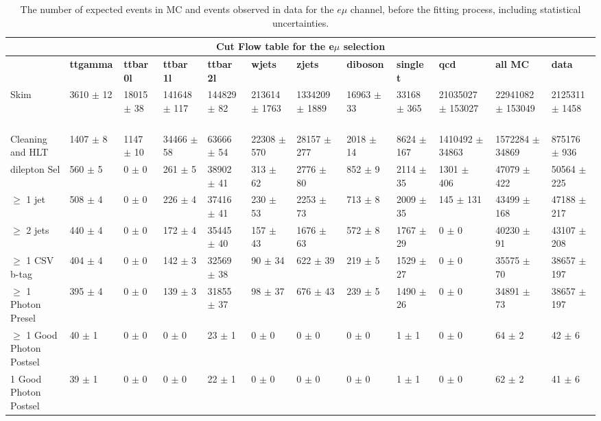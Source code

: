 \begin{table}
  \centering
\resizebox{\columnwidth}{!} {

\begin{tabular}{|l|l|l|l|l|l|l|l|l|l|l|l|}
\hline
\multicolumn{12}{|c|}{\textbf{Cut Flow table for the e$\mu$ selection}} \\
\hline
& \textbf{ttgamma} & \textbf{ttbar 0l} & \textbf{ttbar 1l} & \textbf{ttbar 2l} & \textbf{wjets} & \textbf{zjets} & \textbf{diboson} & \textbf{single t} & \textbf{qcd} & \textbf{all MC} & \textbf{data} \\
\hline
Skim & 3610 $\pm$ 12 \ & 18015 $\pm$ 38 \ & 141648 $\pm$ 117 \ & 144829 $\pm$ 82 \ & 213614 $\pm$ 1763 \ & 1334209 $\pm$ 1889 \ & 16963 $\pm$ 33 \ & 33168 $\pm$ 365 \ & 21035027 $\pm$ 153027 \ & 22941082 $\pm$ 153049\ & 2125311 $\pm$ 1458 \\
Cleaning and HLT & 1407 $\pm$ 8 \ & 1147 $\pm$ 10 \ & 34466 $\pm$ 58 \ & 63666 $\pm$ 54 \ & 22308 $\pm$ 570 \ & 28157 $\pm$ 277 \ & 2018 $\pm$ 14 \ & 8624 $\pm$ 167 \ & 1410492 $\pm$ 34863 \ & 1572284 $\pm$ 34869\ & 875176 $\pm$ 936 \\
dilepton Sel & 560 $\pm$ 5 \ & 0 $\pm$ 0 \ & 261 $\pm$ 5 \ & 38902 $\pm$ 41 \ & 313 $\pm$ 62 \ & 2776 $\pm$ 80 \ & 852 $\pm$ 9 \ & 2114 $\pm$ 35 \ & 1301 $\pm$ 406 \ & 47079 $\pm$ 422\ & 50564 $\pm$ 225 \\
$\geq$ 1 jet & 508 $\pm$ 4 \ & 0 $\pm$ 0 \ & 226 $\pm$ 4 \ & 37416 $\pm$ 41 \ & 230 $\pm$ 53 \ & 2253 $\pm$ 73 \ & 713 $\pm$ 8 \ & 2009 $\pm$ 35 \ & 145 $\pm$ 131 \ & 43499 $\pm$ 168\ & 47188 $\pm$ 217 \\
$\geq$ 2 jets & 440 $\pm$ 4 \ & 0 $\pm$ 0 \ & 172 $\pm$ 4 \ & 35445 $\pm$ 40 \ & 157 $\pm$ 43 \ & 1676 $\pm$ 63 \ & 572 $\pm$ 8 \ & 1767 $\pm$ 29 \ & 0 $\pm$ 0 \ & 40230 $\pm$ 91\ & 43107 $\pm$ 208 \\
$\geq$ 1 CSV b-tag & 404 $\pm$ 4 \ & 0 $\pm$ 0 \ & 142 $\pm$ 3 \ & 32569 $\pm$ 38 \ & 90 $\pm$ 34 \ & 622 $\pm$ 39 \ & 219 $\pm$ 5 \ & 1529 $\pm$ 27 \ & 0 $\pm$ 0 \ & 35575 $\pm$ 70\ & 38657 $\pm$ 197 \\
$\geq$ 1 Photon Presel & 395 $\pm$ 4 \ & 0 $\pm$ 0 \ & 139 $\pm$ 3 \ & 31855 $\pm$ 37 \ & 98 $\pm$ 37 \ & 676 $\pm$ 43 \ & 239 $\pm$ 5 \ & 1490 $\pm$ 26 \ & 0 $\pm$ 0 \ & 34891 $\pm$ 73\ & 38657 $\pm$ 197 \\
$\geq$ 1 Good Photon Postsel & 40 $\pm$ 1 \ & 0 $\pm$ 0 \ & 0 $\pm$ 0 \ & 23 $\pm$ 1 \ & 0 $\pm$ 0 \ & 0 $\pm$ 0 \ & 0 $\pm$ 0 \ & 1 $\pm$ 1 \ & 0 $\pm$ 0 \ & 64 $\pm$ 2\ & 42 $\pm$ 6 \\
1 Good Photon Postsel & 39 $\pm$ 1 \ & 0 $\pm$ 0 \ & 0 $\pm$ 0 \ & 22 $\pm$ 1 \ & 0 $\pm$ 0 \ & 0 $\pm$ 0 \ & 0 $\pm$ 0 \ & 1 $\pm$ 1 \ & 0 $\pm$ 0 \ & 62 $\pm$ 2\ & 41 $\pm$ 6 \\

\hline
\end{tabular}
}
\caption{The number of expected events in MC and events observed in data for the $e\mu$ channel, before the fitting process, including statistical uncertainties.}
\end{table}

